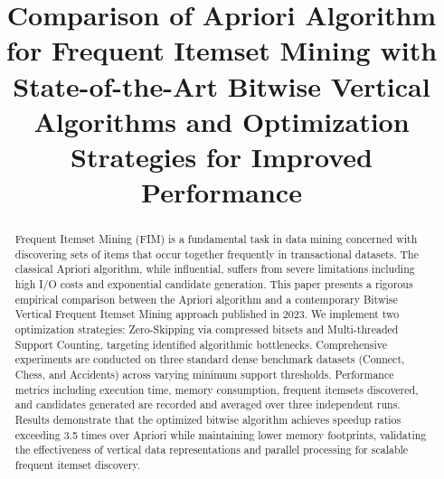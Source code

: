 \documentclass[conference]{IEEEtran}
\begin{document}
\title{Comparison of Apriori Algorithm for Frequent Itemset Mining with State-of-the-Art Bitwise Vertical Algorithms and Optimization Strategies for Improved Performance}

\author{
\and
{}
\and
{}
}

\maketitle

\begin{abstract}
Frequent Itemset Mining (FIM) is a fundamental task in data mining concerned with discovering sets of items that occur together frequently in transactional datasets. The classical Apriori algorithm, while influential, suffers from severe limitations including high I/O costs and exponential candidate generation. This paper presents a rigorous empirical comparison between the Apriori algorithm and a contemporary Bitwise Vertical Frequent Itemset Mining approach published in 2023. We implement two optimization strategies: Zero-Skipping via compressed bitsets and Multi-threaded Support Counting, targeting identified algorithmic bottlenecks. Comprehensive experiments are conducted on three standard dense benchmark datasets (Connect, Chess, and Accidents) across varying minimum support thresholds. Performance metrics including execution time, memory consumption, frequent itemsets discovered, and candidates generated are recorded and averaged over three independent runs. Results demonstrate that the optimized bitwise algorithm achieves speedup ratios exceeding 3.5 times over Apriori while maintaining lower memory footprints, validating the effectiveness of vertical data representations and parallel processing for scalable frequent itemset discovery.
\end{abstract}
\end{document}

